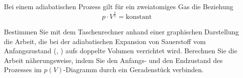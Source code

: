 Bei einem adiabatischen Prozess gilt für ein zweiatomiges Gas die Beziehung
\[
 p\cdot V^{\frac{7}{5}} = \text{konstant}
\]
\begin{abcliste}
\abc Bestimmen Sie mit dem Taschenrechner anhand einer graphischen Darstellung die Arbeit, die bei der adiabatischen Expansion von Sauerstoff vom Anfangszustand (\paO, \VaO) aufs doppelte Volumen verrichtet wird.
\abc Berechnen Sie die Arbeit näherungsweise, indem Sie den Anfangs- und den Endzustand des Prozesses im $p(V)$-Diagramm durch ein Geradenstück verbinden.
\end{abcliste}
